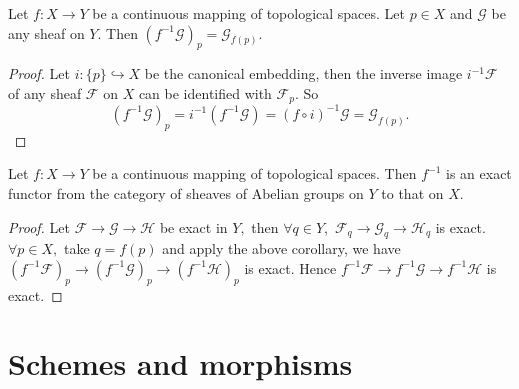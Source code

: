 \begin{cor}
Let $f: X\rightarrow Y$ be a continuous mapping of topological
spaces. Let $p\in X$ and $\mathscr{G}$ be any sheaf on $Y.$ Then
$(f^{-1}\mathscr{G})_p = \mathscr{G}_{f(p)}.$
\end{cor}
\begin{proof}
Let $i: \{p\}\hookrightarrow X$ be the canonical embedding, then the
inverse image $i^{-1}\mathscr{F}$ of any sheaf $\mathscr{F}$ on $X$
can be identified with $\mathscr{F}_p.$ So
$$(f^{-1}\mathscr{G})_p = i^{-1}(f^{-1}\mathscr{G}) = (f\circ
i)^{-1}\mathscr{G} = \mathscr{G}_{f(p)}.$$
\end{proof}
\begin{cor}
Let $f: X\rightarrow Y$ be a continuous mapping of topological
spaces. Then $f^{-1}$ is an exact functor from the category of
sheaves of Abelian groups on $Y$ to that on $X.$
\end{cor}
\begin{proof}
Let $\mathscr{F}\rightarrow \mathscr{G}\rightarrow \mathscr{H}$ be
exact in $Y,$ then $\forall q\in Y,$ $\mathscr{F}_q\rightarrow
\mathscr{G}_q\rightarrow \mathscr{H}_q$ is exact. $\forall p\in X,$
take $q=f(p)$ and apply the above corollary, we have
$(f^{-1}\mathscr{F})_p\rightarrow (f^{-1}\mathscr{G})_p\rightarrow
(f^{-1}\mathscr{H})_p$ is exact. Hence $f^{-1}\mathscr{F}\rightarrow
f^{-1}\mathscr{G}\rightarrow f^{-1}\mathscr{H}$ is exact.
\end{proof}

\newpage

\section{Schemes and morphisms}

